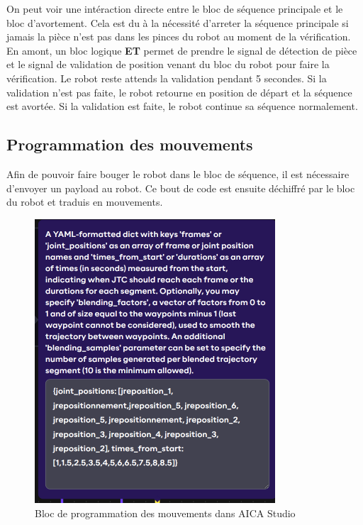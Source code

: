 On peut voir une intéraction directe entre le bloc de séquence principale et le bloc d'avortement. Cela est du à la nécessité d'arreter la séquence principale si jamais la pièce n'est pas dans les pinces du robot au moment de la vérification. En amont, un bloc logique \textbf{ET} permet de prendre le signal de détection de pièce et le signal de validation de position venant du bloc du robot pour faire la vérification. Le robot reste attends la validation pendant 5 secondes. Si la validation n'est pas faite, le robot retourne en position de départ et la séquence est avortée. Si la validation est faite, le robot continue sa séquence normalement.

\subsection{Programmation des mouvements}

Afin de pouvoir faire bouger le robot dans le bloc de séquence, il est nécessaire d'envoyer un \gls{payload} au robot. Ce bout de code est ensuite déchiffré par le bloc du robot et traduis en mouvements.

\begin{figure}[H]
    \centering
    \includegraphics[width=0.8\textwidth]{assets/figures/AICA_payload.png}
    \caption{Bloc de programmation des mouvements dans AICA Studio}
    \label{fig:payload_block}
\end{figure}


